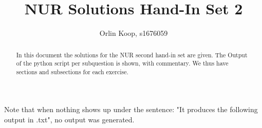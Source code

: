 \documentclass[10pt]{article}
\title{NUR Solutions Hand-In Set 2}
\author{Orlin Koop, s1676059}
\begin{document}
\maketitle

\begin{abstract}
In this document the solutions for the NUR second hand-in set are given. The Output of the python script per subquestion is shown, with commentary. We thus have sections and subsections for each exercise.
\end{abstract}

Note that when nothing shows up under the sentence: "It produces the following output in .txt", no output was generated.
















\end{document}
